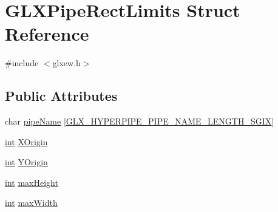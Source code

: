 \hypertarget{struct_g_l_x_pipe_rect_limits}{\section{G\-L\-X\-Pipe\-Rect\-Limits Struct Reference}
\label{struct_g_l_x_pipe_rect_limits}
}


{\ttfamily \#include $<$glxew.\-h$>$}

\subsection*{Public Attributes}
\begin{DoxyCompactItemize}
\item 
char \hyperlink{struct_g_l_x_pipe_rect_limits_ae78b4b6656101bc841946733a5b6e5ce}{pipe\-Name} \mbox{[}\hyperlink{glxew_8h_ae1c8261c0861010d8003a31d07e26005}{G\-L\-X\-\_\-\-H\-Y\-P\-E\-R\-P\-I\-P\-E\-\_\-\-P\-I\-P\-E\-\_\-\-N\-A\-M\-E\-\_\-\-L\-E\-N\-G\-T\-H\-\_\-\-S\-G\-I\-X}\mbox{]}
\item 
\hyperlink{wglew_8h_a500a82aecba06f4550f6849b8099ca21}{int} \hyperlink{struct_g_l_x_pipe_rect_limits_a3e5a965059d9f5d2ca42acd35af5bb9b}{X\-Origin}
\item 
\hyperlink{wglew_8h_a500a82aecba06f4550f6849b8099ca21}{int} \hyperlink{struct_g_l_x_pipe_rect_limits_a50e06bcf0dae95854be7d93a515199e9}{Y\-Origin}
\item 
\hyperlink{wglew_8h_a500a82aecba06f4550f6849b8099ca21}{int} \hyperlink{struct_g_l_x_pipe_rect_limits_a27572e499c0d3280031c2ad8e387c0c1}{max\-Height}
\item 
\hyperlink{wglew_8h_a500a82aecba06f4550f6849b8099ca21}{int} \hyperlink{struct_g_l_x_pipe_rect_limits_a8662c7a712b30620e25fc994adf337a1}{max\-Width}
\end{DoxyCompactItemize}



